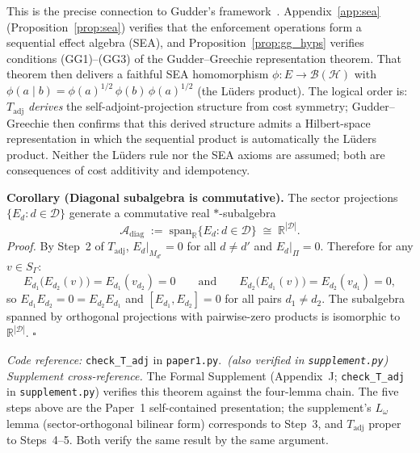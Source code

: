 \documentclass[11pt]{article}
\theoremstyle{remark}
\newcommand{\coderef}[2]{\smallskip\noindent\textit{Code reference:} \texttt{#1} in \texttt{#2}.}
\begin{document}
\begin{tcolorbox}[apfbox, title={Theorem $T_{\mathrm{adj}}$ --- Bridge Step 1: $*$-Involution from Cost Symmetry}]
This is the precise connection to Gudder's framework~\cite{GudderGreechie2002}.  Appendix~\ref{app:sea} (Proposition~\ref{prop:sea}) verifies that the enforcement operations form a sequential effect algebra (SEA), and Proposition~\ref{prop:gg_hyps} verifies conditions (GG1)--(GG3) of the Gudder--Greechie representation theorem.  That theorem then delivers a faithful SEA homomorphism $\phi: E \to \mathcal{B}(\mathcal{H})$ with $\phi(a \mid b) = \phi(a)^{1/2}\,\phi(b)\,\phi(a)^{1/2}$ (the L\"uders product).  The logical order is: $T_{\mathrm{adj}}$ \emph{derives} the self-adjoint-projection structure from cost symmetry; Gudder--Greechie then confirms that this derived structure admits a Hilbert-space representation in which the sequential product is automatically the L\"uders product.  Neither the L\"uders rule nor the SEA axioms are assumed; both are consequences of cost additivity and idempotency.

\smallskip\noindent\textbf{Corollary (Diagonal subalgebra is commutative).}\label{cor:Adiag}
The sector projections $\{E_d : d \in \mathcal{D}\}$ generate a commutative real $*$-subalgebra
\[
\mathcal{A}_{\mathrm{diag}} \;:=\; \mathrm{span}_{\mathbb{R}}\{E_d : d \in \mathcal{D}\} \;\cong\; \mathbb{R}^{|\mathcal{D}|}.
\]
\textit{Proof.}  By Step~2 of $T_{\mathrm{adj}}$, $E_d|_{M_{d'}} = 0$ for all $d \ne d'$ and $E_d|_\Pi = 0$.  Therefore for any $v \in S_\Gamma$:
\[
E_{d_1}\bigl(E_{d_2}(v)\bigr) = E_{d_1}(v_{d_2}) = 0
\qquad\text{and}\qquad
E_{d_2}\bigl(E_{d_1}(v)\bigr) = E_{d_2}(v_{d_1}) = 0,
\]
so $E_{d_1} E_{d_2} = 0 = E_{d_2} E_{d_1}$ and $[E_{d_1}, E_{d_2}] = 0$ for all pairs $d_1 \ne d_2$.
The subalgebra spanned by orthogonal projections with pairwise-zero products is isomorphic to $\mathbb{R}^{|\mathcal{D}|}$.  \hfill$\square$

\coderef{check\_T\_adj}{paper1.py}\,%
\hspace{1em}\textit{(also verified in \texttt{supplement.py})}
\smallskip\noindent\textit{Supplement cross-reference.}  The Formal Supplement (Appendix~J; \texttt{check\_T\_adj} in \texttt{supplement.py}) verifies this theorem against the four-lemma chain.  The five steps above are the Paper~1 self-contained presentation; the supplement's $L_\omega$ lemma (sector-orthogonal bilinear form) corresponds to Step~3, and $T_{\mathrm{adj}}$ proper to Steps~4--5.  Both verify the same result by the same argument.
\end{tcolorbox}
\end{document}
